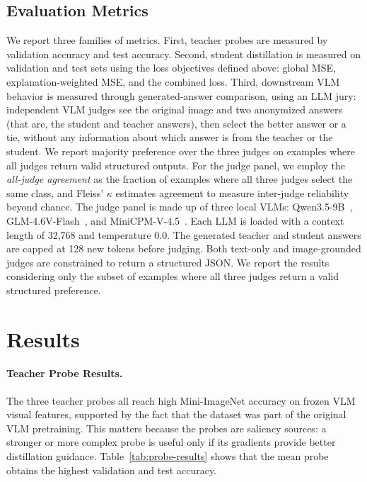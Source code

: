 \documentclass{article}
\begin{document}
\subsection{Evaluation Metrics}
\label{sec:metrics}


We report three families of metrics. First, teacher probes are measured by validation accuracy and test accuracy. Second, student distillation is measured on validation and test sets using the loss objectives defined above: global MSE, explanation-weighted MSE, and the combined loss. Third, downstream VLM behavior is measured through generated-answer comparison, using an LLM jury: independent VLM judges see the original image and two anonymized answers (that are, the student and teacher answers), then select the better answer or a tie, without any information about which answer is from the teacher or the student. We report majority preference over the three judges on examples where all judges return valid structured outputs. For the judge panel, we employ the \emph{all-judge agreement} as the fraction of examples where all three judges select the same class, and Fleiss' $\kappa$ estimates agreement to measure inter-judge reliability beyond chance. The judge panel is made up of three local VLMs: Qwen3.5-9B~\citep{qwen2026qwen35}, GLM-4.6V-Flash~\citep{vteam2025glm45v}, and MiniCPM-V-4.5~\citep{yu2025minicpmv45}.
Each LLM is loaded with a context length of 32,768 and temperature 0.0.
The generated teacher and student answers are capped at 128 new tokens before judging.
Both text-only and image-grounded judges are constrained to return a structured JSON.
We report the results considering only the subset of examples where all three judges return a valid structured preference.


\section{Results}
\label{sec:results}

\paragraph{Teacher Probe Results.}

The three teacher probes all reach high Mini-ImageNet accuracy on frozen VLM visual features, supported by the fact that the dataset was part of the original VLM pretraining.
This matters because the probes are saliency sources: a stronger or more complex probe is useful only if its gradients provide better distillation guidance.
Table~\ref{tab:probe-results} shows that the mean probe obtains the highest validation and test accuracy.
\end{document}

